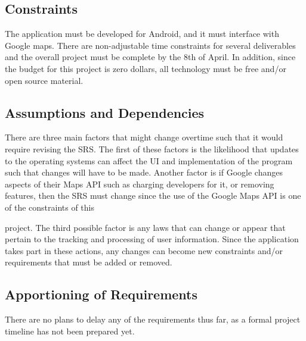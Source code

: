 \documentclass[]{article}
\begin{document}
\subsection{Constraints}
\label{sub:constraints}
The application must be developed for Android, and it must interface with Google maps. There are non-adjustable time constraints for several deliverables and the overall project must be complete by the 8th of April. In addition, since the budget for this project is zero dollars, all technology must be free and/or open source material. 

\subsection{Assumptions and Dependencies}
\label{sub:assumptions_and_dependencies}
There are three main factors that might change overtime such that it would require revising the SRS. The first of these factors is the likelihood that updates to the operating systems can affect the UI and implementation of the program such that changes will have to be made. Another factor is if Google changes aspects of their Maps API such as charging developers for it, or removing features, then the SRS must change since the use of the Google Maps API is one of the constraints of this

project. The third possible factor is any laws that can change or appear that pertain to the tracking and processing of user information. Since the application takes part in these actions, any changes can become new constraints and/or requirements that must be added or removed. 

\subsection{Apportioning of Requirements}
\label{sub:apportioning_of_requirements}
There are no plans to delay any of the requirements thus far, as a formal project timeline has not been prepared yet. 

\end{document}
